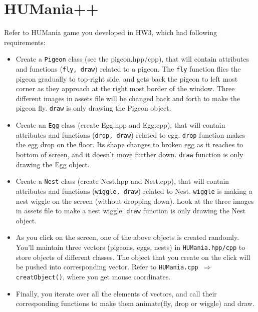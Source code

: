 \documentclass[a4paper,12pt]{article}
\begin{document}
	\section{HUMania++}

	Refer to HUMania game you developed in HW3, which had following requirements:
	\begin{tiny}
	\begin{itemize}
		\item Create a \texttt{Pigeon} class (see the pigeon.hpp/cpp), that will contain attributes and functions (\texttt{fly, draw}) related to a pigeon. The \texttt{fly} function flies the pigeon gradually to top-right side, and gets back the pigeon to left most corner as they approach at the right most border of the window. Three different images in assets file will be changed back and forth to make the pigeon fly. \texttt{draw} is only drawing the Pigeon object.
		
		\item Create an \texttt{Egg} class (create Egg.hpp and Egg.cpp), that will contain attributes and functions (\texttt{drop, draw}) related to egg. \texttt{drop} function makes the egg drop on the floor. Its shape changes to broken egg as it reaches to bottom of screen, and it doesn't move further down. \texttt{draw} function is only drawing the Egg object.
		
		\item Create a \texttt{Nest} class (create Nest.hpp and Nest.cpp), that will contain attributes and functions (\texttt{wiggle, draw}) related to Nest. \texttt{wiggle} is making a nest wiggle on the screen (without dropping down). Look at the three images in assets file to make a nest wiggle. \texttt{draw} function is only drawing the Nest object.
		
		\item As you click on the screen, one of the above objects is created randomly. You'll maintain three vectors (pigeons, eggs, nests) in \texttt{HUMania.hpp/cpp} to store objects of different classes. The object that you create on the click will be pushed into corresponding vector. Refer to \texttt{HUMania.cpp $ \Rightarrow $ creatObject()}, where you get mouse coordinates.
		
		\item Finally, you iterate over all the elements of vectors, and call their corresponding functions to make them animate(fly, drop or wiggle) and draw.

	\end{itemize}

	\end{tiny}
		
\end{document}
